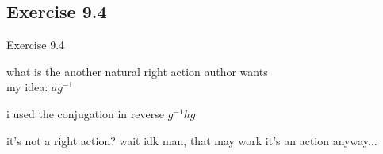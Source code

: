 \documentclass[15pt]{scrartcl}
\begin{document}
\subsection{Exercise 9.4}
\begin{discussion*}Exercise 9.4
    \begin{abboy*}
        what is the another natural right action author wants
        \\
        my idea: $ag^{-1}$
    \end{abboy*}
    \begin{arthur*}
        i used the conjugation in reverse $g^{-1} h g$
    \end{arthur*}
    \begin{abboy*}
        it's not a right action?
        wait
        idk man, that may work 
        it's an action anyway...


\end{abboy*}
\end{discussion*}
\end{document}
